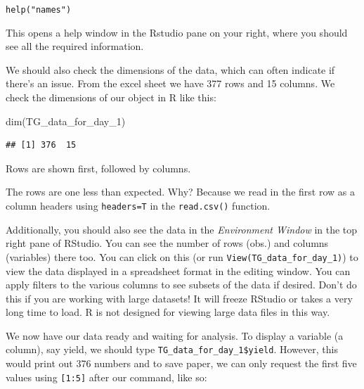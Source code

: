 \documentclass[
]{book}
\makeatletter
\newenvironment{Shaded}{\begin{snugshade}}{\end{snugshade}}
\newcommand{\DecValTok}[1]{\textcolor[rgb]{0.00,0.00,0.81}{#1}}
\newcommand{\FunctionTok}[1]{\textcolor[rgb]{0.00,0.00,0.00}{#1}}
\newcommand{\NormalTok}[1]{#1}
\newcommand{\SpecialCharTok}[1]{\textcolor[rgb]{0.00,0.00,0.00}{#1}}
\newenvironment{kframe}{%
\medskip{}
\setlength{\fboxsep}{.8em}
 \def\at@end@of@kframe{}%
 \ifinner\ifhmode%
  \def\at@end@of@kframe{\end{minipage}}%
  \begin{minipage}{\columnwidth}%
 \fi\fi%
 \def\FrameCommand##1{\hskip\@totalleftmargin \hskip-\fboxsep
 \colorbox{shadecolor}{##1}\hskip-\fboxsep
     \hskip-\linewidth \hskip-\@totalleftmargin \hskip\columnwidth}%
 \MakeFramed {\advance\hsize-\width
   \@totalleftmargin\z@ \linewidth\hsize
   \@setminipage}}%
 {\par\unskip\endMakeFramed%
 \at@end@of@kframe}
\newenvironment{rmdblock}[1]
  {
  \begin{itemize}
  \renewcommand{\labelitemi}{
    \raisebox{-.7\height}[0pt][0pt]{
      {\setkeys{Gin}{width=3em,keepaspectratio}\texttt{[image: images/\#1]}}
    }
  }
  \setlength{\fboxsep}{1em}
  \begin{kframe}
  \item
  }
  {
  \end{kframe}
  \end{itemize}
  }
\newenvironment{rmdcaution}
  {\begin{rmdblock}{caution}}
  {\end{rmdblock}}
\makeatother
\begin{document}
\texttt{help("names")}

This opens a help window in the Rstudio pane on your right, where you should see all the required information.

We should also check the dimensions of the data, which can often indicate if there's an issue. From the excel sheet we have 377 rows and 15 columns. We check the dimensions of our object in R like this:

\begin{Shaded}
\begin{Highlighting}[]
\FunctionTok{dim}\NormalTok{(TG\_data\_for\_day\_1)}
\end{Highlighting}
\end{Shaded}

\begin{verbatim}
## [1] 376  15
\end{verbatim}

Rows are shown first, followed by columns.

\begin{rmdcaution}
The rows are one less than expected. Why? Because we read in the first row as a column headers using \texttt{headers=T} in the \texttt{read.csv()} function.
\end{rmdcaution}

Additionally, you should also see the data in the \emph{Environment Window} in the top right pane of RStudio. You can see the number of rows (obs.) and columns (variables) there too. You can click on this (or run \texttt{View(TG\_data\_for\_day\_1)}) to view the data displayed in a spreadsheet format in the editing window. You can apply filters to the various columns to see subsets of the data if desired. Don't do this if you are working with large datasets! It will freeze RStudio or takes a very long time to load. R is not designed for viewing large data files in this way.

We now have our data ready and waiting for analysis. To display a variable (a column), say yield, we should type \texttt{TG\_data\_for\_day\_1\$yield}. However, this would print out 376 numbers and to save paper, we can only request the first five values using \texttt{{[}1:5{]}} after our command, like so:

\begin{Shaded}
\end{Shaded}
\end{document}
